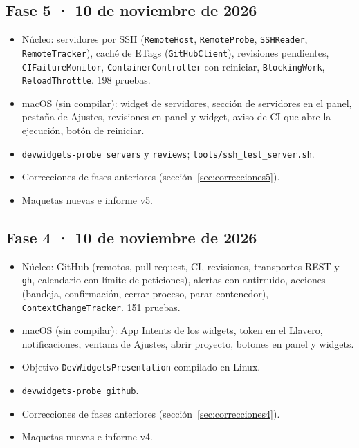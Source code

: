 \documentclass[11pt,a4paper]{article}
\begin{document}
\subsection*{Fase 5 · 10 de noviembre de 2026}
\begin{itemize}
  \item Núcleo: servidores por SSH (\texttt{RemoteHost},
    \texttt{RemoteProbe}, \texttt{SSHReader}, \texttt{RemoteTracker}),
    caché de ETags (\texttt{GitHubClient}), revisiones pendientes,
    \texttt{CIFailureMonitor}, \texttt{ContainerController} con
    reiniciar, \texttt{BlockingWork}, \texttt{ReloadThrottle}. 198
    pruebas.
  \item macOS (sin compilar): widget de servidores, sección de
    servidores en el panel, pestaña de Ajustes, revisiones en panel y
    widget, aviso de CI que abre la ejecución, botón de reiniciar.
  \item \texttt{devwidgets-probe servers} y \texttt{reviews};
    \texttt{tools/ssh\_test\_server.sh}.
  \item Correcciones de fases anteriores
    (sección~\ref{sec:correcciones5}).
  \item Maquetas nuevas e informe v5.
\end{itemize}

\subsection*{Fase 4 · 10 de noviembre de 2026}
\begin{itemize}
  \item Núcleo: GitHub (remotos, pull request, CI, revisiones,
    transportes REST y \texttt{gh}, calendario con límite de
    peticiones), alertas con antirruido, acciones (bandeja,
    confirmación, cerrar proceso, parar contenedor),
    \texttt{ContextChangeTracker}. 151 pruebas.
  \item macOS (sin compilar): App Intents de los widgets, token en el
    Llavero, notificaciones, ventana de Ajustes, abrir proyecto,
    botones en panel y widgets.
  \item Objetivo \texttt{DevWidgetsPresentation} compilado en Linux.
  \item \texttt{devwidgets-probe github}.
  \item Correcciones de fases anteriores
    (sección~\ref{sec:correcciones4}).
  \item Maquetas nuevas e informe v4.
\end{itemize}
\end{document}
